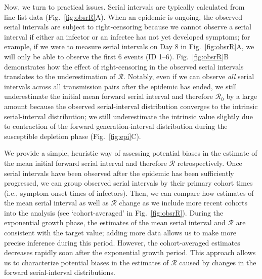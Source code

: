 \documentclass[12pt]{article}
\newcommand{\fref}[1]{Fig.~\ref{fig:#1}}
\newcommand{\Rx}[1]{\ensuremath{{\mathcal R}_{#1}}\xspace}
\newcommand{\Ro}{\Rx{0}}
\newcommand{\RR}{\ensuremath{{\mathcal R}}\xspace}
\begin{document}
Now, we turn to practical issues.
Serial intervals are typically calculated from line-list data (\fref{obsrR}A).
When an epidemic is ongoing, the observed serial intervals are subject to right-censoring because we cannot observe a serial interval if either an infector or an infectee has not yet developed symptoms;
for example, if we were to measure serial intervals on Day 8 in \fref{obsrR}A, we will only be able to observe the first 6 events (ID 1--6).
\fref{obsrR}B demonstrates how the effect of right-censoring in the observed serial intervals translates to the underestimation of \RR.
Notably, even if we can observe \emph{all} serial intervals across all transmission pairs after the epidemic has ended, we still underestimate the initial mean forward serial interval and therefore \Ro by a large amount because the observed serial-interval distribution converges to the intrinsic serial-interval distribution;
we still underestimate the intrinsic value slightly due to contraction of the forward generation-interval distribution during the susceptible depletion phase (\fref{epi}C).

We provide a simple, heuristic way of assessing potential biases in the estimate of the mean initial forward serial interval and therefore \RR retrospectively.
Once serial intervals have been observed after the epidemic has been sufficiently progressed, we can group observed serial intervals by their primary cohort times (i.e., symptom onset times of infectors).
Then, we can compare how estimates of the mean serial interval as well as \RR change as we include more recent cohorts into the analysis (see `cohort-averaged' in \fref{obsrR}).
During the exponential growth phase, the estimates of the mean serial interval and \RR are consistent with the target value;
adding more data allows us to make more precise inference during this period.
However, the cohort-averaged estimates decreases rapidly soon after the exponential growth period.
This approach allows us to characterize potential biases in the estimates of \RR caused by changes in the forward serial-interval distributions.
\end{document}
